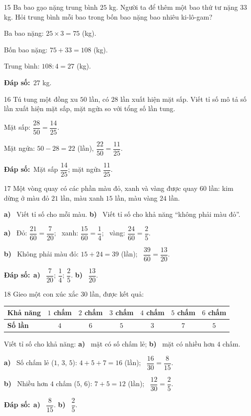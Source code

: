 \documentclass[11pt]{article}
\newif\ifsol \solfalse
\providecommand{\AnsWord}{Đáp số}
\newcommand{\dapso}[1]{\par\textbf{\AnsWord:}\ #1}
\newcommand{\probsol}[1]{%
  \begin{lrbox}{\solmeasure}\begin{minipage}{\dimexpr\linewidth-24pt\relax}#1\end{minipage}\end{lrbox}%
  \ifsol
    \begin{solbox}#1\end{solbox}%
  \else
    \setlength{\solht}{\dimexpr\ht\solmeasure+\dp\solmeasure+0.85cm\relax}%
    \ifdim\solht<1.35cm\setlength{\solht}{1.35cm}\fi
    \begin{tcolorbox}[colback=white,colframe=Line,boxrule=0.8pt,arc=5pt,
      left=8pt,right=8pt,top=4pt,bottom=4pt,height=\solht]{\footnotesize\color{Slate}\itshape\WorkWord}\end{tcolorbox}%
  \fi}
\newcommand{\pa}[1]{\textbf{#1)}\ }
\newcommand{\gap}{\vspace{0.3cm}}
\def\WorkWord{Bài làm:}
\def\AnsWord{Đáp số}
\begin{document}
\gap
\begin{probbox}{15}{\relax}
Ba bao gạo nặng trung bình $25$ kg. Người ta để thêm một bao thứ tư nặng $33$ kg. Hỏi trung bình mỗi bao trong bốn bao nặng bao nhiêu ki-lô-gam?
\end{probbox}
\probsol{
Ba bao nặng: $25\times3=75$ (kg).\par Bốn bao nặng: $75+33=108$ (kg).\par Trung bình: $108:4=27$ (kg).
\dapso{$27$ kg.}}
\gap
\begin{probbox}{16}{\relax}
Tú tung một đồng xu $50$ lần, có $28$ lần xuất hiện mặt sấp. Viết tỉ số mô tả số lần xuất hiện mặt sấp, mặt ngửa so với tổng số lần tung.
\end{probbox}
\probsol{
Mặt sấp: $\dfrac{28}{50}=\dfrac{14}{25}$.\par Mặt ngửa: $50-28=22$ (lần), $\dfrac{22}{50}=\dfrac{11}{25}$.
\dapso{Mặt sấp $\dfrac{14}{25}$; mặt ngửa $\dfrac{11}{25}$.}}
\gap
\begin{probbox}{17}{\relax}
Một vòng quay có các phần màu đỏ, xanh và vàng được quay $60$ lần: kim dừng ở màu đỏ $21$ lần, màu xanh $15$ lần, màu vàng $24$ lần.\par
\pa{a} Viết tỉ số cho mỗi màu. \quad \pa{b} Viết tỉ số cho khả năng ``không phải màu đỏ''.
\end{probbox}
\probsol{
\pa{a} Đỏ: $\dfrac{21}{60}=\dfrac{7}{20}$; \ xanh: $\dfrac{15}{60}=\dfrac14$; \ vàng: $\dfrac{24}{60}=\dfrac25$.\par
\pa{b} Không phải màu đỏ: $15+24=39$ (lần); \ $\dfrac{39}{60}=\dfrac{13}{20}$.
\dapso{\pa{a} $\dfrac{7}{20}$; $\dfrac14$; $\dfrac25$. \pa{b} $\dfrac{13}{20}$.}}
\gap
\needspace{5cm}
\begin{probbox}{18}{\relax}
Gieo một con xúc xắc $30$ lần, được kết quả:
\begin{center}
\begin{tabular}{|l|c|c|c|c|c|c|}
\hline
\textbf{Khả năng} & $1$ chấm & $2$ chấm & $3$ chấm & $4$ chấm & $5$ chấm & $6$ chấm\\\hline
\textbf{Số lần} & $4$ & $6$ & $5$ & $3$ & $7$ & $5$\\\hline
\end{tabular}
\end{center}
Viết tỉ số cho khả năng: \pa{a} mặt có số chấm lẻ; \quad \pa{b} mặt có nhiều hơn $4$ chấm.
\end{probbox}
\probsol{
\pa{a} Số chấm lẻ ($1$, $3$, $5$): $4+5+7=16$ (lần); \ $\dfrac{16}{30}=\dfrac{8}{15}$.\par
\pa{b} Nhiều hơn $4$ chấm ($5$, $6$): $7+5=12$ (lần); \ $\dfrac{12}{30}=\dfrac25$.
\dapso{\pa{a} $\dfrac{8}{15}$. \pa{b} $\dfrac25$.}}
\end{document}
